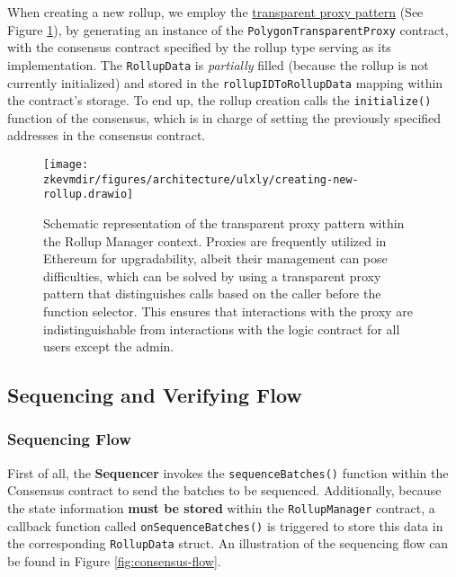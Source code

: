 When creating a new rollup, we employ the
\href{https://blog.openzeppelin.com/the-transparent-proxy-pattern}{transparent
proxy pattern} (See Figure \ref{fig:transparent-proxy}), by generating an
instance of the \texttt{PolygonTransparentProxy} contract, with the consensus
contract specified by the rollup type serving as its implementation. The
\texttt{RollupData} is \textit{partially} filled (because the rollup is not
currently initialized) and stored in the \texttt{rollupIDToRollupData} mapping
within the contract's storage. To end up, the rollup creation calls the
\texttt{initialize()} function of the consensus, which is in charge of setting
the previously specified addresses in the consensus contract.

\vspace{1em}

\begin{figure}[H]
\centering
\texttt{[image: \\zkevmdir/figures/architecture/ulxly/creating-new-rollup.drawio]}
\caption{Schematic representation of the transparent proxy pattern within the
Rollup Manager context. Proxies are frequently utilized in Ethereum for
upgradability, albeit their management can pose difficulties, which can be
solved by using a transparent proxy pattern that distinguishes calls based on
the caller before the function selector. This ensures that interactions with
the proxy are indistinguishable from interactions with the logic contract for
all users except the admin.}
\label{fig:transparent-proxy}
\end{figure}



\subsection{Sequencing and Verifying Flow}

\subsubsection{Sequencing Flow}

First of all, the \textbf{Sequencer} invokes the \texttt{sequenceBatches()} function within the Consensus contract to send the batches to be sequenced. Additionally, because the state information \textbf{must be stored} within the \texttt{RollupManager} contract, a callback function called \texttt{onSequenceBatches()} is triggered to store this data in the corresponding \texttt{RollupData} struct. An illustration of the sequencing flow can be found in Figure \ref{fig:consensus-flow}.

